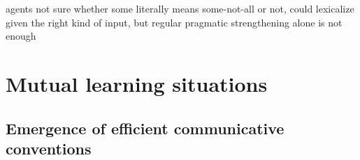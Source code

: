 \documentclass{article} %
\begin{document}



agents not sure whether some literally means some-not-all or not,
could lexicalize given the right kind of input, but regular pragmatic
strengthening alone is not enough

\section{Mutual learning situations}


\subsection{Emergence of efficient communicative conventions}
\label{sec:emergence}
\end{document}
